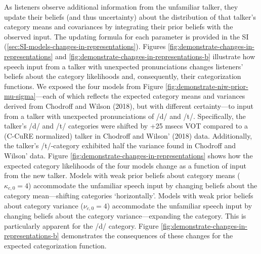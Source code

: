\documentclass[
  11pt,
  man,floatsintext]{apa6}
\begin{document}
As listeners observe additional information from the unfamiliar talker, they update their beliefs (and thus uncertainty) about the distribution of that talker's category means and covariances by integrating their prior beliefs with the observed input. The updating formula for each parameter is provided in the SI (\ref{sec:SI-models-changes-in-representations}). Figures \ref{fig:demonstrate-changes-in-representations} and \ref{fig:demonstrate-changes-in-representations-b} illustrate how speech input from a talker with unexpected pronunciations changes listeners' beliefs about the category likelihoods and, consequently, their categorization functions. We exposed the four models from Figure \ref{fig:demonstrate-niw-prior-mu-sigma}---each of which reflects the expected category means and variances derived from Chodroff and Wilson (2018), but with different certainty---to input from a talker with unexpected pronunciations of /d/ and /t/. Specifically, the talker's /d/ and /t/ categories were shifted by +25 msecs VOT compared to a (C-CuRE normalized) talker in Chodroff and Wilson' (2018) data. Additionally, the talker's /t/-category exhibited half the variance found in Chodroff and Wilson' data. Figure \ref{fig:demonstrate-changes-in-representations} shows how the expected category likelihoods of the four models change as a function of input from the new talker. Models with weak prior beliefs about category means (\(\kappa_{c,0}=4\)) accommodate the unfamiliar speech input by changing beliefs about the category mean---shifting categories `horizontally'. Models with weak prior beliefs about category variance (\(\nu_{c,0}=4\)) accommodate the unfamiliar speech input by changing beliefs about the category variance---expanding the category. This is particularly apparent for the /d/ category. Figure \ref{fig:demonstrate-changes-in-representations-b} demonstrates the consequences of these changes for the expected categorization function.
\end{document}
